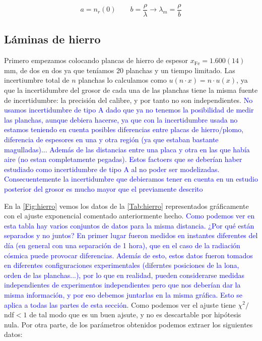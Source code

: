 \documentclass[11pt]{article}
\begin{document}
\begin{equation}
	a = n_r(0) \qquad b = \frac{\rho}{\lambda} \rightarrow \lambda_m = \frac{\rho}{b}
\end{equation}



\subsection{Láminas de hierro}

Primero empezamos colocando plancas de hierro de espesor $x_{\text{Fe}}=1.600(14)$ mm, de dos en dos ya que teníamos 20 planchas y un tiempo limitado. Las incertiumbre total de $n$ planchas lo calculamos como $u(n\cdot x) = n \cdot u(x)$, ya que la incertidumbre del grosor de cada una de las planchas tiene la misma fuente de incertidumbre: la precisión del calibre, y por tanto no son independientes. \textcolor{blue}{No usamos incertidumbre de tipo A dado que ya no tenemos la posibilidad de medir las planchas, aunque debiera hacerse, ya que con la incertidumbre usada no estamos teniendo en cuenta posibles diferencias entre placas de hierro/plomo, diferencia de espesores en una y otra región (ya que estaban bastante magulladas)... Además de las distancias entre una placa y otra en las que había aire (no estan completamente pegadas). Estos factoers que se deberían haber estudiado como incertidumbre de tipo A al no poder ser modelizadas. Consecuentemente la incertidumbre que debieramos tener en cuenta en un estudio posterior del grosor es mucho mayor que el previamente descrito} 

En la \cref{Fig:hierro} vemos los datos de la \cref{Tab:hierro} representados gráficamente con el ajuste exponencial comentado anteriormente hecho. \textcolor{blue}{Como podemos ver en esta tabla hay varios conjuntos de datos para la misma distancia. ¿Por qué están separados y no juntos? En primer lugar fueron medidos en instantes diferentes del día (en general con una separación de 1 hora), que en el caso de la radiación cósmica puede provocar diferencias. Además de esto, estos datos fueron tomados en diferentes configuraciones experimentales (diferntes posiciones de la lona, orden de las planchas...), por lo que en realidad, pueden considerarse medidas independientes de experimentos independientes pero que nos deberían dar la misma información, y por eso debemos juntarlas en la misma gráfica. Esto se aplica a todas las partes de esta sección}. Como podemos ver el ajuste tiene $\chi^2/$ndf$<1$ de tal modo que es un buen ajsute, y no es descartable por hipótesis nula. Por otra parte, de los parámetros obtenidos podemos extraer los siguientes datos: 
\end{document}
